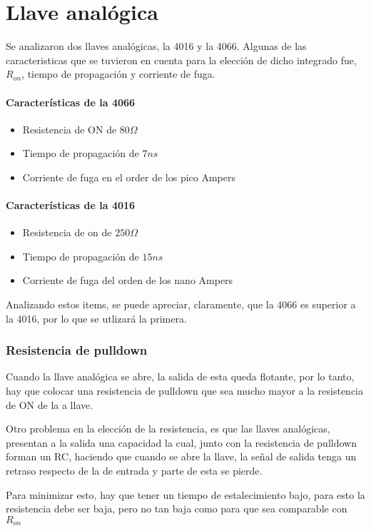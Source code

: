 \documentclass[../../ASSD_TP1_G7.tex]{subfiles}
\begin{document}
\chapter*{Llave anal\'ogica}
Se analizaron dos llaves analógicas, la 4016 y la 4066. Algunas de las caracteristicas que se tuvieron en cuenta para la elección de dicho integrado fue, $R_{on}$, tiempo de propagación y corriente de fuga.
\subsubsection*{Características de la 4066}
\begin{itemize}
\item Resistencia de ON de $80 \Omega$
\item Tiempo de propagación de $7ns$
\item Corriente de fuga en el order de los pico Ampers
\end{itemize}
\subsubsection*{Características de la 4016}
\begin{itemize}
\item Resistencia de on de $250\Omega$ 
\item Tiempo de propagación de $15ns$
\item Corriente de fuga del orden de los nano Ampers
\end{itemize}

Analizando estos items, se puede apreciar, claramente, que la 4066 es superior a la 4016, por lo que se utlizará la primera.
\subsection*{Resistencia de pulldown}
Cuando la llave analógica se abre, la salida de esta queda flotante, por lo tanto, hay que colocar una resistencia de pulldown que sea mucho mayor a la resistencia de ON de la a llave.

Otro problema en la elección de la resistencia, es que las llaves anal\'ogicas, presentan a la salida una capacidad la cual, junto con la resistencia de pulldown forman un RC, haciendo que cuando se abre la llave, la se\~nal de salida tenga un retraso respecto de la de entrada y parte de esta se pierde.

Para minimizar esto, hay que tener un tiempo de estalecimiento bajo, para esto la resistencia debe ser baja, pero no tan baja como para que sea comparable con $R_{on}$
\end{document}
